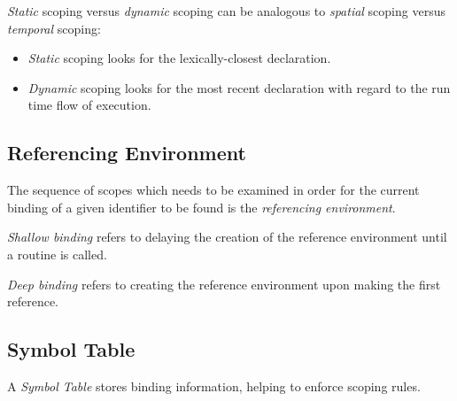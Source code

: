 \begin{remark}
    \textit{Static} scoping versus \textit{dynamic} scoping can be analogous to \textit{spatial} scoping versus \textit{temporal} scoping:
    \begin{itemize}
        \item \textit{Static} scoping looks for the lexically-closest declaration.
        \item \textit{Dynamic} scoping looks for the most recent declaration with regard to the run time flow of execution.
    \end{itemize}
\end{remark}

\subsection{Referencing Environment}

\begin{definition}
    The sequence of scopes which needs to be examined in order for the current binding of a given identifier to be found is the \textit{referencing environment}.
\end{definition}

\begin{definition}
    \textit{Shallow binding} refers to delaying the creation of the reference environment until a routine is called.
\end{definition}

\begin{definition}
    \textit{Deep binding} refers to creating the reference environment upon making the first reference.
\end{definition}

\subsection{Symbol Table}

\begin{definition}
    A \textit{Symbol Table} stores binding information, helping to enforce scoping rules.
\end{definition}


